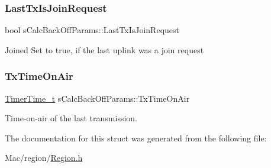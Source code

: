 \subsubsection{\texorpdfstring{Last\+Tx\+Is\+Join\+Request}{LastTxIsJoinRequest}}
{\footnotesize\ttfamily bool s\+Calc\+Back\+Off\+Params\+::\+Last\+Tx\+Is\+Join\+Request}

Joined Set to true, if the last uplink was a join request \mbox{\label{structsCalcBackOffParams_a90a1f5a96d10105fc2229e5c76393fd0}} 
\subsubsection{\texorpdfstring{Tx\+Time\+On\+Air}{TxTimeOnAir}}
{\footnotesize\ttfamily \hyperlink{utilities_8h_a4215ca43d3e953099ea758ce428599d0}{Timer\+Time\+\_\+t} s\+Calc\+Back\+Off\+Params\+::\+Tx\+Time\+On\+Air}

Time-\/on-\/air of the last transmission. 

The documentation for this struct was generated from the following file\+:\begin{DoxyCompactItemize}
\item 
Mac/region/\hyperlink{Region_8h}{Region.\+h}\end{DoxyCompactItemize}
